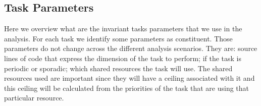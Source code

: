\documentclass[10pt,a4paper]{report}
\begin{document}
\subsection{Task Parameters}
Here we overview what are the invariant tasks parameters that we use
in the analysis. For each task we identify some parameters as constituent. 
Those parameters do not change across the different analysis scenarios. They are:
source lines of code that express the dimension of the task to perform; if the 
task is periodic or sporadic; which shared resources the task will use. The 
shared resources used are important since they will have a ceiling associated 
with it and this ceiling will be calculated from the priorities of the task that
are using that particular resource. 
\begin{table}[tb]
\caption{
    Constituent parameters of task set. SLOC stands for source lines of code.
    This parameters are fixed for each operation mode. For a full list of 
    correspondence between the acronym and the shared resource that it represent
    see table \ref{resacronym}. 
}
\end{table}
\end{document}
